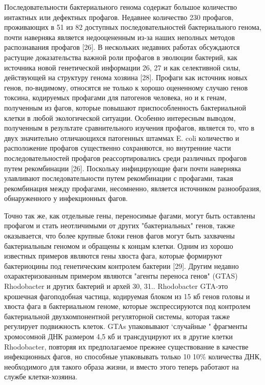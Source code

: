 \documentclass[a4paper,12pt]{article}
\begin{document}
    \par{Последовательности бактериального генома содержат большое количество интактных или дефектных профагов. Недавнее
    количество 230 профагов, проживающих в 51 из 82 доступных последовательностей бактериального генома, почти наверняка
    является недооцененным из-за наших неполных методов распознавания профагов [26]. В нескольких недавних работах
    обсуждаются растущие доказательства важной роли профагов в эволюции бактерий, как источника новой генетической
    информации 26, 27 и как селективной силы, действующей на структуру генома хозяина [28]. Профаги как источник новых
    генов, по-видимому, относятся не только к хорошо оцененному случаю генов токсина, кодируемых профагами для патогенов
    человека, но и к генам, полученным из фагов, которые повышают приспособленность бактериальной клетки в любой
    экологической ситуации. Особенно интересным выводом, полученным в результате сравнительного изучения профагов,
    является то, что в двух значительно отличающихся патогенных штаммах E. coli количество и расположение профагов
    существенно сохраняются, но внутренние части последовательностей профагов реассортировались среди различных профагов
    путем рекомбинации [26]. Поскольку инфицирующие фаги почти наверняка улавливают последовательности путем
    рекомбинации с профагами, такая рекомбинация между профагами, несомненно, является источником разнообразия,
    обнаруженного у инфекционных фагов.}
    
    \par{Точно так же, как отдельные гены, переносимые фагами, могут быть оставлены профагом и стать неотличимыми от
    других "бактериальных" генов, также оказывается, что более крупные блоки генов фагов могут быть захвачены
    бактериальным геномом и обращены к концам клетки. Одним из хорошо известных примеров являются гены хвоста фага, 
    которые формируют бактериоцины под генетическим контролем бактерии [29]. Другим недавно охарактеризованным примером
    являются "агенты переноса генов" (GTAS) Rhodobacter и других бактерий и архей 30, 31.. Rhodobacter GTA-это крошечная
    фагоподобная частица, кодируемая блоком из 15 кб генов головы и хвоста фага в бактериальном геноме, которые
    экспрессируются под контролем бактериальной двухкомпонентной регуляторной системы, которая также регулирует
    подвижность клеток. GTAs упаковывают ‘случайные " фрагменты хромосомной ДНК размером 4,5 кб и трансдуцируют их в
    другие клетки Rhodobacter, повторяя их предполагаемое прежнее существование в качестве инфекционных фагов, но
    способные упаковывать только 10 10\% количества ДНК, необходимого для такого образа жизни, и вместо этого теперь
    работают на службе клетки-хозяина.}
    
\end{document}
